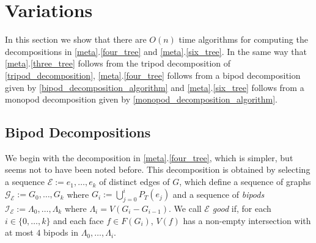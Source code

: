 \documentclass{patmorin}
\begin{document}
\section{Variations}
\label{variants}

In this section we show that there are $O(n)$ time algorithms for computing the decompositions in \cref{meta}.\ref{four_tree} and \cref{meta}.\ref{six_tree}.  In the same way that \cref{meta}.\ref{three_tree} follows from the tripod decomposition of \cref{tripod_decomposition}, \cref{meta}.\ref{four_tree} follows from a bipod decomposition given by \cref{bipod_decomposition_algorithm} and \cref{meta}.\ref{six_tree} follows from a monopod decomposition given by \cref{monopod_decomposition_algorithm}.




%

\subsection{Bipod Decompositions}

We begin with the decomposition in \cref{meta}.\ref{four_tree}, which is simpler, but seems not to have been noted before.  This decomposition is obtained by selecting a sequence $\mathcal{E}:=e_1,\ldots,e_k$ of distinct edges of $G$, which define a sequence of graphs $\mathcal{G_E}:=G_{0},\ldots,G_k$ where $G_i:=\bigcup_{j=0}^i P_T(e_j)$ and a sequence of \emph{bipods} $\mathcal{I_E}:=\Lambda_0,\ldots,\Lambda_k$ where $\Lambda_i=V(G_i-G_{i-1})$.  We call $\mathcal{E}$ \emph{good} if, for each $i\in\{0,\ldots,k\}$ and each face $f\in F(G_i)$, $V(f)$ has a non-empty intersection with at most $4$ bipods in $\Lambda_0,\ldots,\Lambda_i$.
\end{document}

